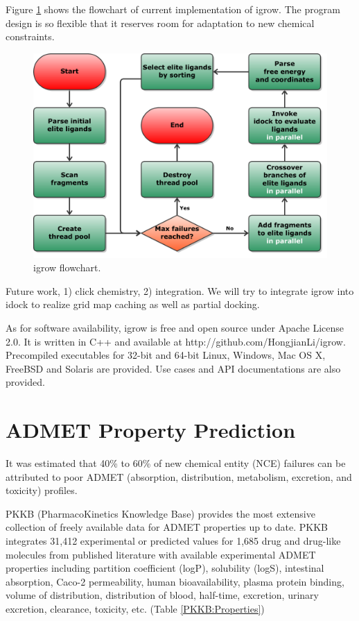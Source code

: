 Figure \ref{igrow:Flowchart} shows the flowchart of current implementation of igrow. The program design is so flexible that it reserves room for adaptation to new chemical constraints.

\begin{figure}
\centering
\includegraphics[width=\textwidth]{igrow/Flowchart.pdf}
\caption{igrow flowchart.}
\label{igrow:Flowchart}
\end{figure}

Future work, 1) click chemistry, 2) integration.
We will try to integrate igrow into idock to realize grid map caching as well as partial docking.
 
As for software availability, igrow is free and open source under Apache License 2.0. It is written in C++ and available at http://github.com/HongjianLi/igrow. Precompiled executables for 32-bit and 64-bit Linux, Windows, Mac OS X, FreeBSD and Solaris are provided. Use cases and API documentations are also provided.

\section{ADMET Property Prediction}

It was estimated that 40\% to 60\% of new chemical entity (NCE) failures can be attributed to poor ADMET (absorption, distribution, metabolism, excretion, and toxicity) profiles.

PKKB (PharmacoKinetics Knowledge Base) \citep{1133} provides the most extensive collection of freely available data for ADMET properties up to date. PKKB integrates 31,412 experimental or predicted values for 1,685 drug and drug-like molecules from published literature with available experimental ADMET properties including partition coefficient (logP), solubility (logS), intestinal absorption, Caco-2 permeability, human bioavailability, plasma protein binding, volume of distribution, distribution of blood, half-time, excretion, urinary excretion, clearance, toxicity, etc. (Table \ref{PKKB:Properties})

